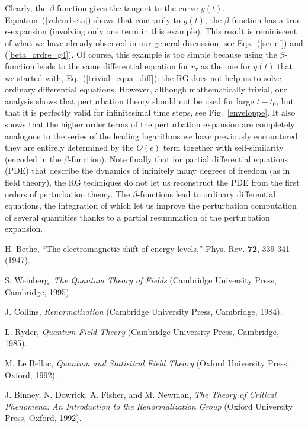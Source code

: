 \documentclass[floatfix,twocolumn,preprintnumbers,amsmath,amssymb,prb]{revtex4}
\begin{document}
{{Clearly, the $\beta$-function gives the tangent to the curve
$y(t)$. Equation~(\ref{valeurbeta}) shows that contrarily to
$y(t)$, the
$\beta$-function has a true $\epsilon$-expansion (involving only
one term
in this example). 
This result is reminiscent of what we have already observed
in our general discussion, see Eqs.~(\ref{serief}) and
(\ref{beta_ordre_g4}). Of course, this example is too simple
because using the $\beta$-function leads to the same 
differential equation for $r_\tau$ as the one for $y(t)$ that we
started with, Eq.~(\ref{trivial_equa_diff}): the RG does not help
us to solve ordinary differential equations. 
However, although mathematically trivial, our analysis
shows that perturbation theory should not be used for large
$t-t_0$, but that it is perfectly valid for infinitesimal time
steps, see Fig.~\ref{enveloppe}. It also shows that
the higher order terms of the perturbation expansion are
completely analogous to the series of the leading logarithms we
have previously encountered: they are entirely determined by the
$O(\epsilon)$ term together with self-similarity (encoded in the
$\beta$-function). Note finally that for partial differential
equations (PDE) that describe the dynamics of infinitely many
degrees of freedom (as in field theory), the RG techniques do not
let us reconstruct the PDE from the first orders of perturbation
theory. The $\beta$-functions lead to ordinary
differential equations, the integration of which let us improve the
perturbation computation of several quantities thanks to a partial
resummation of the perturbation
expansion.\cite{shirkov01,kovalev99}

\begin{thebibliography}{10}

H. Bethe, ``The electromagnetic shift of energy levels,'' Phys.
Rev. \textbf{72}, 339-341 (1947). 

 S. Weinberg,
\emph{The Quantum Theory of Fields} (Cambridge University Press,
Cambridge, 1995).

J. Collins,
\emph{Renormalization} (Cambridge University Press, Cambridge,
1984).

L. Ryder,
\emph{Quantum Field Theory} (Cambridge
University Press, Cambridge, 1985).

 M. Le Bellac,
\emph{Quantum and Statistical Field Theory} (Oxford University
Press, Oxford, 1992).

 J. Binney, N. Dowrick, A. Fisher, and M. Newman,
\emph{The Theory of Critical Phenomena: An Introduction to the
Renormalization Group} (Oxford University Press, Oxford, 1992).


\end{thebibliography}}}
\end{document}
